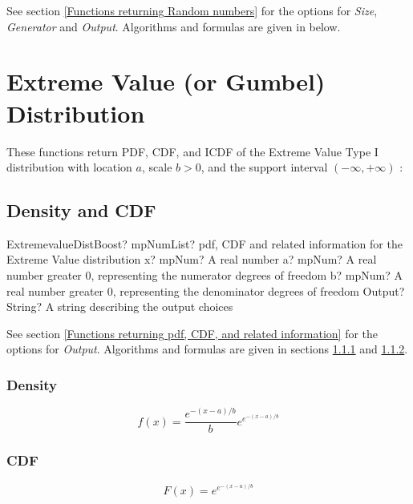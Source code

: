 \vspace{0.3cm}

See section \ref{Functions returning Random numbers} for the options for  {\itshape\sffamily Size},  {\itshape\sffamily Generator} and {\itshape\sffamily Output}. Algorithms and formulas are given in below.




\newpage
\section{Extreme Value (or Gumbel) Distribution}

These functions return PDF, CDF, and ICDF of the Extreme Value Type I distribution
with location $a$, scale $b > 0$, and the support interval $(-\infty,+\infty)$ :



\subsection{Density and CDF}

\begin{mpFunctionsExtract}
	\mpFunctionFourNotImplemented
	{ExtremevalueDistBoost? mpNumList? pdf, CDF and related information for the Extreme Value distribution}
	{x? mpNum? A real number}
	{a? mpNum? A real number greater 0, representing the numerator  degrees of freedom}
	{b? mpNum? A real number greater 0, representing the denominator degrees of freedom}
	{Output? String? A string describing the output choices}
\end{mpFunctionsExtract}


\vspace{0.3cm}
See section \ref{Functions returning pdf, CDF, and related information} for the options for {\itshape\sffamily Output}. Algorithms and formulas are given in sections \ref{ExtremevalueDistributionDensity} and \ref{ExtremevalueDistributionCDF}.


\subsubsection{Density}
\label{ExtremevalueDistributionDensity}

\begin{equation} 
	f(x)=\frac{e^{-(x-a)/b}}{b} e^{e^{-(x-a)/b}}
\end{equation}


\subsubsection{CDF}
\label{ExtremevalueDistributionCDF}
\begin{equation} 
	F(x)= e^{e^{-(x-a)/b}}
\end{equation}



